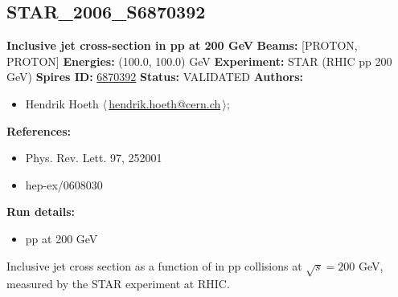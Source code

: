 \subsection[STAR\_2006\_S6870392]{STAR\_2006\_S6870392\,\cite{Abelev:2006uq}}
\textbf{Inclusive jet cross-section in pp at 200 GeV}\newline
\textbf{Beams:} [PROTON, PROTON] \newline
\textbf{Energies:} (100.0, 100.0) GeV \newline
\textbf{Experiment:} STAR (RHIC pp 200 GeV) \newline
\textbf{Spires ID:} \href{http://www.slac.stanford.edu/spires/find/hep/www?rawcmd=key+6870392}{6870392}\newline
\textbf{Status:} VALIDATED\newline
\textbf{Authors:}
\begin{itemize}
  \item Hendrik Hoeth $\langle\,$\href{mailto:hendrik.hoeth@cern.ch}{hendrik.hoeth@cern.ch}$\,\rangle$;
\end{itemize}
\textbf{References:}
\begin{itemize}
  \item Phys. Rev. Lett. 97, 252001
  \item hep-ex/0608030
\end{itemize}
\textbf{Run details:}
\begin{itemize}

  \item pp at 200 GeV\end{itemize}

\noindent Inclusive jet cross section as a function of \pT in pp collisions at $\sqrt{s} = 200$ GeV, measured by the STAR experiment at RHIC.

\clearpage


\clearpage

